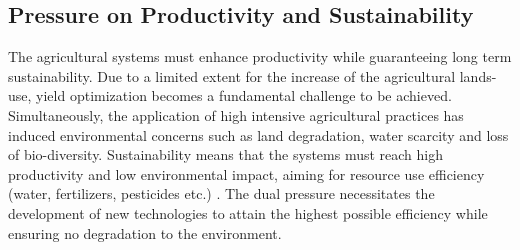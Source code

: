 \subsection{Pressure on Productivity and Sustainability}

The agricultural systems must enhance productivity while guaranteeing long term sustainability. Due to a limited extent for the increase of the agricultural lands-use, yield optimization becomes a fundamental challenge to be achieved. Simultaneously, the application of high intensive agricultural practices has induced environmental concerns such as land degradation, water scarcity and loss of bio-diversity. Sustainability means that the systems must reach high productivity and low environmental impact, aiming for resource use efficiency (water, fertilizers, pesticides etc.) \cite{Tilman2011}. The dual pressure necessitates the development of new technologies to attain the highest possible efficiency while ensuring no degradation to the environment.

